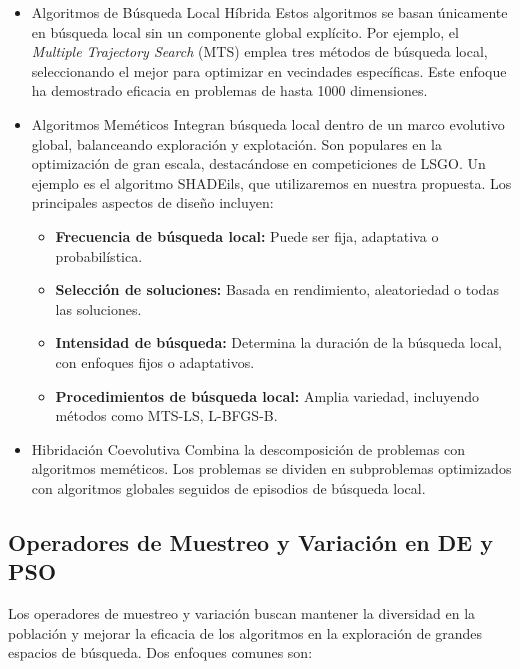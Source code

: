 \begin{itemize}
\item{Algoritmos de Búsqueda Local Híbrida}
Estos algoritmos se basan únicamente en búsqueda local sin un componente global explícito. Por ejemplo, el \textit{Multiple Trajectory Search} (MTS) emplea tres métodos de búsqueda local, seleccionando el mejor para optimizar en vecindades específicas. Este enfoque ha demostrado eficacia en problemas de hasta 1000 dimensiones.

\item{Algoritmos Meméticos}
Integran búsqueda local dentro de un marco evolutivo global, balanceando exploración y explotación. Son populares en la optimización de gran escala, destacándose en competiciones de LSGO. Un ejemplo es el algoritmo SHADEils, que utilizaremos en nuestra propuesta. Los principales aspectos de diseño incluyen:
\begin{itemize}
    \item \textbf{Frecuencia de búsqueda local:} Puede ser fija, adaptativa o probabilística.
    \item \textbf{Selección de soluciones:} Basada en rendimiento, aleatoriedad o todas las soluciones.
    \item \textbf{Intensidad de búsqueda:} Determina la duración de la búsqueda local, con enfoques fijos o adaptativos.
    \item \textbf{Procedimientos de búsqueda local:} Amplia variedad, incluyendo métodos como MTS-LS, L-BFGS-B.
\end{itemize}

\item{Hibridación Coevolutiva}
Combina la descomposición de problemas con algoritmos meméticos. Los problemas se dividen en subproblemas optimizados con algoritmos globales seguidos de episodios de búsqueda local. 
\end{itemize}

\subsection*{Operadores de Muestreo y Variación en DE y PSO}

Los operadores de muestreo y variación buscan mantener la diversidad en la población y mejorar la eficacia de los algoritmos en la exploración de grandes espacios de búsqueda. Dos enfoques comunes son:


